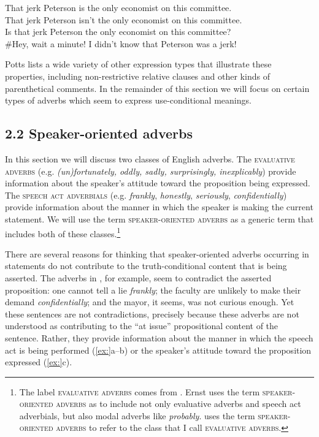 \ea
\ea That jerk Peterson is the only economist on this committee.\\
\ex That jerk Peterson isn’t the only economist on this committee.\\
\ex Is that jerk Peterson the only economist on this committee?\\
\ex \#Hey, wait a minute! I didn’t know that Peterson was a jerk!
                       \z
\z


Potts lists a wide variety of other expression types that illustrate these properties, including non-restrictive relative clauses and other kinds of parenthetical comments. In the remainder of this section we will focus on certain types of adverbs which seem to express use-conditional meanings.


\subsection{2.2  Speaker-oriented adverbs}\label{sec:}

In this section we will discuss two classes of English adverbs. The \textsc{evaluative adverbs (}e.g. \textit{(un)fortunately, oddly, sadly, surprisingly, inexplicably}) provide information about the speaker’s attitude toward the proposition being expressed. The \textsc{speech act adverbials (}e.g. \textit{frankly}, \textit{honestly}, \textit{seriously}, \textit{confidentially}) provide information about the manner in which the speaker is making the current statement. We will use the term \textsc{speaker-oriented adverbs} as a generic term that includes both of these classes.\footnote{The label \textsc{evaluative adverbs} comes from \citet{Ernst2009}. Ernst uses the term \textsc{speaker-oriented adverbs} as to include not only evaluative adverbs and speech act adverbials, but also modal adverbs like \textit{probably}. \citet{Potts2005} uses the term \textsc{speaker-oriented adverbs} to refer to the class that I call \textsc{evaluative adverbs}.}



There are several reasons for thinking that speaker-oriented adverbs occurring in statements do not contribute to the truth-conditional content that is being asserted. The adverbs in , for example, seem to contradict the asserted proposition: one cannot tell a lie \textit{frankly}; the faculty are unlikely to make their demand \textit{confidentially}; and the mayor, it seems, was not curious enough. Yet these sentences are not contradictions, precisely because these adverbs are not understood as contributing to the “at issue” propositional content of the sentence. Rather, they provide information about the manner in which the speech act is being performed (\ref{ex:}a--b) or the speaker’s attitude toward the proposition expressed (\ref{ex:}c).


